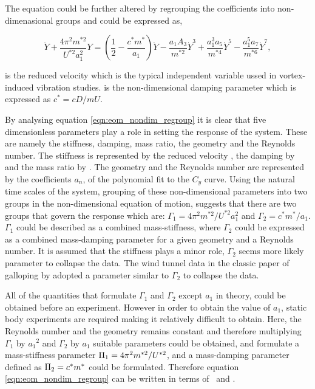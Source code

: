  The equation could be further altered by regrouping the coefficients into non-dimenasional groups and could be expressed as, 
 
  \begin{equation}
  \label{eqn:eom_nondim_regroup}
  \ddot{Y} + \frac{4\pi^{2}m^{*2}}{U^{*2}a_1^2}Y = \left(\frac{1}{2} - \frac{c^*m^*}{a_1}\right)\dot{Y} - \frac{a_1A_3}{m^{*2}}\dot{Y}^3 + \frac{a_1^3a_5}{m^{*4}}\dot{Y}^5 - \frac{a_1^5a_7}{m^{*6}}\dot{Y}^7,
  \end{equation}  

\ustar is the reduced velocity which is the typical independent variable ussed in vortex-induced vibration studies. \cstar is the non-dimensional damping parameter which is expressed as $c^*=cD/mU$. 

By analysing equation \ref{eqn:eom_nondim_regroup} it is clear that five dimensionless parameters play a role in setting the response of the system. These are namely the stiffness, damping, mass ratio, the geometry and the Reynolds number. The stiffness is represented by the reduced velocity \ustar, the damping by \cstar and the mass ratio by \mstar. The geometry and the Reynolds number are represented by the coefficients $a_n$, of the polynomial fit to the $C_y$ curve. Using the natural time scales of the system, grouping of these non-dimensional parameters into two groups in the non-dimensional equation of motion, suggests that there are two groups that govern the response which are: $\Gamma_1 = 4\pi^2m^{*2}/U^{*2}a_1^2$ and $\Gamma_2 = c^*m^*/a_1$. $\Gamma_1$ could be described as a combined mass-stiffness, where $\Gamma_2$ could be expressed as a combined mass-damping parameter for a given geometry and a Reynolds number. It is assumed that the stiffness plays a minor role, $\Gamma_2$ seems more likely parameter to collapse the data. The wind tunnel data in the classic paper of galloping by \citet{Parkinson1964} adopted a parameter similar to $\Gamma_2$ to collapse the data. 

All of the quantities that formulate $\Gamma_1$ and $\Gamma_2$ except $a_1$ in theory, could be obtained before an experiment. However in order to obtain the value of $a_1$, static body experiments are required making it relatively difficult to obtain. Here, the Reynolds number and the geometry remains constant and therefore multiplying $\Gamma_1$ by ${a_1}^2$ and $\Gamma_2$ by $a_1$ suitable parameters could be obtained, and formulate a mass-stiffness parameter $\Pi_1 =  4\pi^2m^{*2}/U^{*2}$, and a mass-damping parameter defined as $\Pi_2 = c^*m^*$ could be formulated. Therefore equation \ref{eqn:eom_nondim_regroup} can be written in terms of \massstiff \ and \massdamp. 

